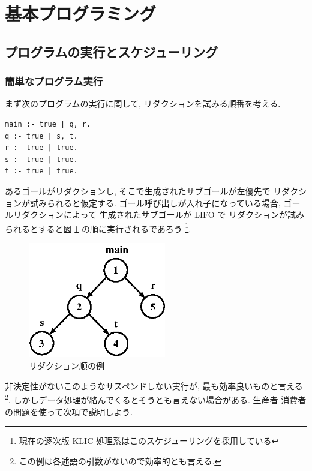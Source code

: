 \documentclass[a4,titlepage]{jsreport}
\begin{document}
\section{基本プログラミング}
\subsection{プログラムの実行とスケジューリング}
\subsubsection{簡単なプログラム実行}
まず次のプログラムの実行に関して, リダクションを試みる順番を考える.
\begin{center}
\begin{minipage}{12cm}
\begin{Verbatim}[baselinestretch=0.8]
main :- true | q, r.
q :- true | s, t.
r :- true | true.
s :- true | true.
t :- true | true.
\end{Verbatim}
\end{minipage}
\end{center}

あるゴールがリダクションし, そこで生成されたサブゴールが左優先で
リダクションが試みられると仮定する.  
ゴール呼び出しが入れ子になっている場合, ゴールリダクションによって
生成されたサブゴールが LIFO で
リダクションが試みられるとすると図 \ref{prio1-1} の順に実行されるであろう
\footnote{現在の逐次版 KLIC 処理系はこのスケジューリングを採用している}.  

\begin{figure}[h]
\begin{center}
\includegraphics[width=6cm]{fig/pri1-1.eps}
\caption{リダクション順の例}\label{prio1-1}
\end{center}
\end{figure}

非決定性がないこのようなサスペンドしない実行が, 最も効率良いものと言える
\footnote{この例は各述語の引数がないので効率的とも言える.}.  
しかしデータ処理が絡んでくるとそうとも言えない場合がある.  生産者-消費者
の問題を使って次項で説明しよう.  
\end{document}
